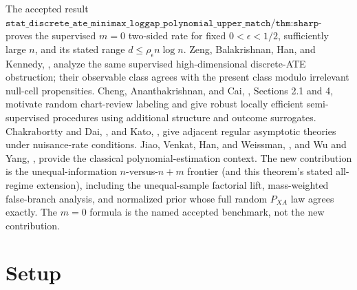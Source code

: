 \documentclass{article}
\begin{document}
The accepted result \(\texttt{stat\_discrete\_ate\_minimax\_loggap\_polynomial\_upper\_match/thm:sharp-minimax-fixed-interior}\) proves the supervised \(m=0\) two-sided rate for fixed \(0<\epsilon<1/2\), sufficiently large \(n\), and its stated range \(d\le\rho_\epsilon n\log n\). Zeng, Balakrishnan, Han, and Kennedy, \cite{ZengBalakrishnanHanKennedy2024}, analyze the same supervised high-dimensional discrete-ATE obstruction; their observable class agrees with the present class modulo irrelevant null-cell propensities. Cheng, Ananthakrishnan, and Cai, \cite{ChengAnanthakrishnanCai2021}, Sections 2.1 and 4, motivate random chart-review labeling and give robust locally efficient semi-supervised procedures using additional structure and outcome surrogates. Chakrabortty and Dai, \cite{ChakraborttyDai2024}, and Kato, \cite{Kato2025}, give adjacent regular asymptotic theories under nuisance-rate conditions. Jiao, Venkat, Han, and Weissman, \cite{JiaoVenkatHanWeissman2015}, and Wu and Yang, \cite{WuYang2016}, provide the classical polynomial-estimation context. The new contribution is the unequal-information \(n\)-versus-\(n+m\) frontier (and this theorem's stated all-regime extension), including the unequal-sample factorial lift, mass-weighted false-branch analysis, and normalized prior whose full random \(P_{XA}\) law agrees exactly. The \(m=0\) formula is the named accepted benchmark, not the new contribution.

\section{Setup}
\end{document}
